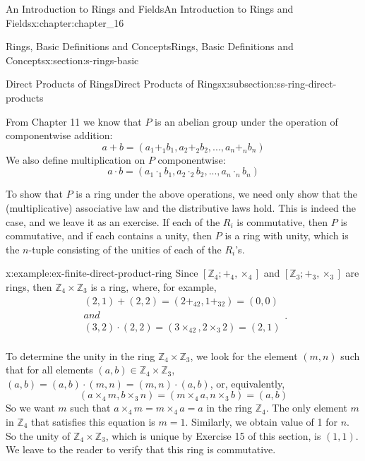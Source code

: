 \documentclass[twoside,10pt,]{book}
\numberwithin{equation}{section}
\begin{document}
\begin{chapterptx}{An Introduction to Rings and Fields}{}{An Introduction to Rings and Fields}{}{}{x:chapter:chapter_16}
\begin{sectionptx}{Rings, Basic Definitions and Concepts}{}{Rings, Basic Definitions and Concepts}{}{}{x:section:s-rings-basic}
\begin{subsectionptx}{Direct Products of Rings}{}{Direct Products of Rings}{}{}{x:subsection:ss-ring-direct-products}
\par
From Chapter 11 we know that \(P\) is an abelian group under the operation of componentwise addition:%
\begin{equation*}
a + b = \left(a_1 +_1 b_1, a_2 +_2 b_2 , . . . , a_n +_n b_n\right)
\end{equation*}
We also define multiplication on \(P\) componentwise:%
\begin{equation*}
a \cdot  b = \left(a_1 \cdot_1 b_1, a_2 \cdot _2 b_2 , . . . , a_n \cdot_n b_n\right)
\end{equation*}
%
\par
To show that \(P\) is a ring under the above operations, we need only show that the (multiplicative) associative law and the distributive laws hold. This is indeed the case, and we leave it as an exercise. If each of the \(R_i\) is commutative, then \(P\) is commutative, and if each contains a unity, then \(P\) is a ring with unity, which is the \(n\)-tuple consisting of the unities of each of the \(R_i\)'s.%
\begin{example}{}{x:example:ex-finite-direct-product-ring}%
Since \(\left[\mathbb{Z}_4;+_4,\times_4\right]\)  and \(\left[\mathbb{Z}_3;+_3,\times_3\right]\) are rings, then \(\mathbb{Z}_4 \times
\mathbb{Z}_3\) is a ring, where, for example,%
\begin{equation*}
\begin{array}{c}
(2, 1) + (2, 2) = (2 +_42, 1 +_32) = (0, 0)\\
and\\
(3, 2) \cdot (2, 2) =  (3 \times_42, 2 \times_3 2) = (2, 1)\\
\end{array}\text{.}
\end{equation*}
%
\par
To determine the unity in the ring \(\mathbb{Z}_4\times \mathbb{Z}_3\), we look for the element \((m, n)\) such that for all elements \((a, b) \in \mathbb{Z}_4\times \mathbb{Z}_3\), \((a, b) =(a, b)\cdot (m, n) = (m, n)\cdot (a, b)\), or, equivalently,%
\begin{equation*}
\left(a \times_4 m, b \times_3 n\right) = \left(m \times_4 a, n \times_3 b\right) = (a, b)
\end{equation*}
So we want \(m\) such that \(a\times_4 m = m\times_4 a=a\) in the ring \(\mathbb{Z}_4\). The only element \(m\) in \(\mathbb{Z}_4\) that satisfies this equation is \(m = 1\). Similarly, we obtain value of 1 for \(n\). So the unity of  \(\mathbb{Z}_4\times \mathbb{Z}_3\), which is unique by Exercise 15 of this section, is \((1, 1)\). We leave to the reader to verify that this ring is commutative.%

\end{example}
\end{subsectionptx}
\end{sectionptx}
\end{chapterptx}
\end{document}

